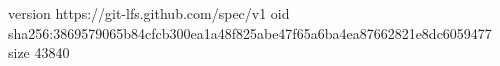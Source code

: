 version https://git-lfs.github.com/spec/v1
oid sha256:3869579065b84cfcb300ea1a48f825abe47f65a6ba4ea87662821e8dc6059477
size 43840
